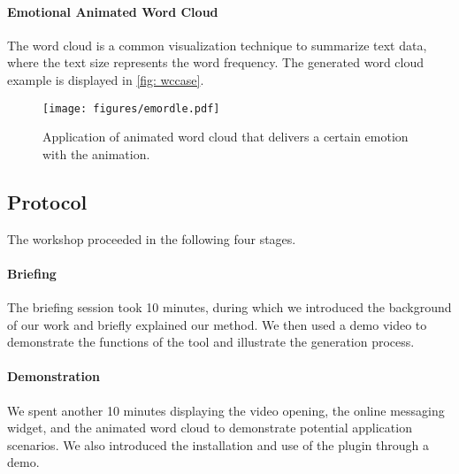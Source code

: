 \paragraph{Emotional Animated Word Cloud}
The word cloud is a common visualization technique to summarize text data, where the text size represents the word frequency.
The generated word cloud example is displayed in \autoref{fig: wccase}.

\begin{figure}[t]
  \centering
  \texttt{[image: figures/emordle.pdf]}
  \caption{Application of animated word cloud that delivers a certain emotion with the animation.}
  \label{fig: wccase}
\end{figure}



\subsection{Protocol}
The workshop proceeded in the following four stages.

\paragraph{Briefing}
The briefing session took 10 minutes, during which we introduced the background of our work and briefly explained our method. We then used a demo video to demonstrate the functions of the tool and illustrate the generation process.

\paragraph{Demonstration} 
We spent another 10 minutes displaying the video opening, the online messaging widget, and the animated word cloud to demonstrate potential application scenarios. We also introduced the installation and use of the plugin through a demo.

